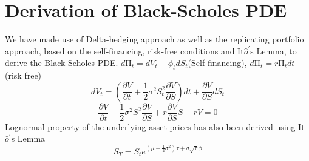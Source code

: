 \section*{Derivation of Black-Scholes PDE}
We have made use of Delta-hedging approach as well as the replicating portfolio approach, based on the self-financing, risk-free conditions and It$\hat{o}^{\prime}$s Lemma, to derive the Black-Scholes PDE.
$d\mathrm{\Pi}_{t} = dV_{t} - \phi_{t}dS_{t}$(Self-financing), \quad $d\mathrm{\Pi}_{t} = r\mathrm{\Pi}_{t}dt$(risk free)
$$dV_{t} = (\frac{\partial V}{\partial t}+\frac{1}{2}\sigma^{2}S_{t}^{2}\frac{\partial V}{\partial S})dt + \frac{\partial V}{\partial S}dS_{t}$$
$$\frac{\partial V}{\partial t}+\frac{1}{2}\sigma^{2}S^{2}\frac{\partial V}{\partial S} + r\frac{\partial V}{\partial S}S - rV = 0$$
Lognormal property of the underlying asset prices has also been derived using It$\hat{o}^{\prime}$s Lemma
$$S_{T} = S_{t}e^{(\mu - \frac{1}{2}\sigma^{2})\tau + \sigma\sqrt{\tau}\phi}$$

